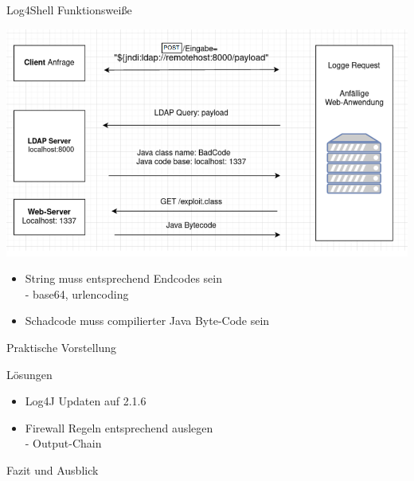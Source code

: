 \documentclass{beamer}
\begin{document}
\begin{frame}{Log4Shell Funktionsweiße}
\begin{center}
\includegraphics[scale=0.35]{log4s.png}
\end{center}
\end{frame}
\begin{frame}
 \begin{itemize}
  \item String muss entsprechend Endcodes sein\\
  - base64, urlencoding
  \item Schadcode muss compilierter Java Byte-Code sein
 \end{itemize}

\end{frame}

\begin{frame}{Praktische Vorstellung}
 
\end{frame}
\begin{frame}{Lösungen}
\begin{itemize}
 \item Log4J Updaten auf 2.1.6
 \item Firewall Regeln entsprechend auslegen\\
 - Output-Chain
\end{itemize}

 
\end{frame}
\begin{frame}{Fazit und Ausblick}
 
\end{frame}
\end{document}
